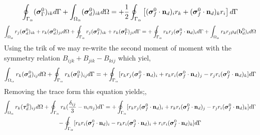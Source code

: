 \begin{multline}
    \oint_{\Gamma_{\alpha}}  (\bm{\sigma}_\Gamma^0)_{ik} d\Gamma
    +\int_{\Omega_{\alpha}}  (\bm{\sigma}_d^0)_{ik} d\Omega
    = 
    +
    \frac{1}{2}\oint_{\Gamma_{\alpha}}  \left[
        (\bm{\sigma}_f^0 \cdot \textbf{n}_d)_i r_k
        + (\bm{\sigma}_f^0 \cdot \textbf{n}_d)_k r_i
    \right]
     d\Gamma
\end{multline}
\begin{multline}
    \int_{\Omega_{\alpha}}  r_{j}(\bm{\sigma}^0_d)_{ik}+r_{k}(\bm{\sigma}^0_d)_{ji} d\Omega
    +\oint_{\Gamma_{\alpha}}  r_{j}(\bm{\sigma}^0_I)_{ik}+r_{k}(\bm{\sigma}_\Gamma^0)_{ji} d\Gamma
    = 
    +\oint_{\Gamma_{\alpha}}   r_{k}r_{j} (\bm{\sigma}_f^0\cdot\textbf{n}_d)_i  d\Gamma
    + \int_{\Omega_{\alpha}}  r_{k}r_{j}  \rho_d (\textbf{b}_d^0)_i  d\Omega 
\end{multline}
Using the trik of \citet{lhuillier1996contribution} we may re-write the second moment of moment with the symmetry relation  $B_{ijk} + B_{jik} - B_{kij}$  which yiel, 
\begin{multline}
    \int_{\Omega_{\alpha}}  r_{k}(\bm{\sigma}^0_d)_{ij} d\Omega
    +\oint_{\Gamma_{\alpha}}  r_{k}(\bm{\sigma}_\Gamma^0)_{ij} d\Gamma
    = 
    +\oint_{\Gamma_{\alpha}}   [r_{k}r_{j} (\bm{\sigma}_f^0\cdot\textbf{n}_d)_i
    +   r_{k}r_{i} (\bm{\sigma}_f^0\cdot\textbf{n}_d)_j
    -   r_{j}r_{i} (\bm{\sigma}_f^0\cdot\textbf{n}_d)_k]  d\Gamma
\end{multline}
Removing the trace form this equation yields;, 
\begin{multline}
    \int_{\Omega_{\alpha}}  r_{k}(\bm{\tau}^0_d)_{ij} d\Omega
    +\oint_{\Gamma_{\alpha}}  r_{k}(\frac{\delta_{ij}}{3} - n_in_j) d\Gamma
    = 
    +\oint_{\Gamma_{\alpha}}   [r_{k}r_{j} (\bm{\sigma}_f^0\cdot\textbf{n}_d)_i
    +   r_{k}r_{i} (\bm{\sigma}_f^0\cdot\textbf{n}_d)_j
    -   r_{j}r_{i} (\bm{\sigma}_f^0\cdot\textbf{n}_d)_k]  d\Gamma\\
    - \oint_{\Gamma_{\alpha}}   [r_{k}r_{i} (\bm{\sigma}_f^0\cdot\textbf{n}_d)_i
    -    r_{k}r_{i} (\bm{\sigma}_f^0\cdot\textbf{n}_d)_i
    +   r_{i}r_{i} (\bm{\sigma}_f^0\cdot\textbf{n}_d)_k]  d\Gamma
\end{multline}

